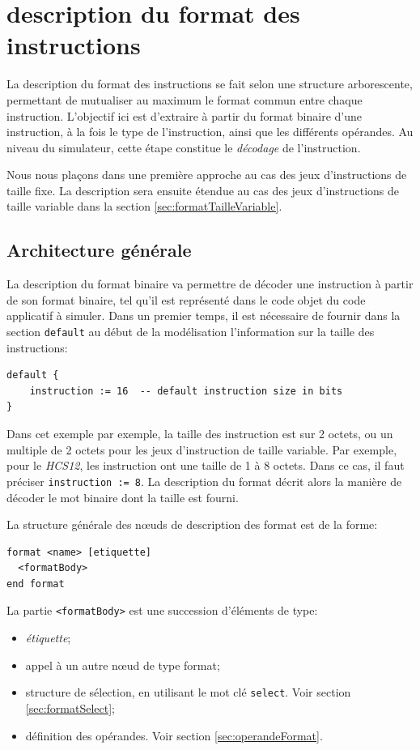 \chapter{description du format des instructions}
\label{chap:format}
La description du format des instructions se fait selon une structure arborescente, permettant de mutualiser au maximum le format commun entre chaque instruction. L'objectif ici est d'extraire à partir du format binaire d'une instruction, à la fois le type de l'instruction, ainsi que les différents opérandes. Au niveau du simulateur, cette étape constitue le \emph{décodage} de l'instruction.

Nous nous plaçons dans une première approche au cas des jeux d'instructions de taille fixe. La description sera ensuite étendue au cas des jeux d'instructions de taille variable dans la section \ref{sec:formatTailleVariable}.

\section{Architecture générale}
La description du format binaire va permettre de décoder une instruction à partir de son format binaire, tel qu'il est représenté dans le code objet du code applicatif à simuler. Dans un premier temps, il est nécessaire de fournir dans la section \texttt{default} au début de la modélisation l'information sur la taille des instructions:
\begin{lstlisting}
default {
    instruction := 16  -- default instruction size in bits
}
\end{lstlisting}
Dans cet exemple par exemple, la taille des instruction est sur 2 octets, ou un multiple de 2 octets pour les jeux d'instruction de taille variable. Par exemple, pour le \emph{HCS12}, les instruction ont une taille de 1 à 8 octets. Dans ce cas, il faut préciser \texttt{instruction := 8}.
La description du format décrit alors la manière de décoder le mot binaire dont la taille est fourni.

La structure générale des nœuds de description des format est de la forme:
\begin{lstlisting}
format <name> [etiquette]
  <formatBody>
end format
\end{lstlisting}

La partie \texttt{<formatBody>} est une succession d'éléments de type:
\begin{itemize}
\item \emph{étiquette};
\item appel à un autre nœud de type format;
\item structure de sélection, en utilisant le mot clé \texttt{select}. Voir section \ref{sec:formatSelect};
\item définition des opérandes. Voir section \ref{sec:operandeFormat}.
\end{itemize}

